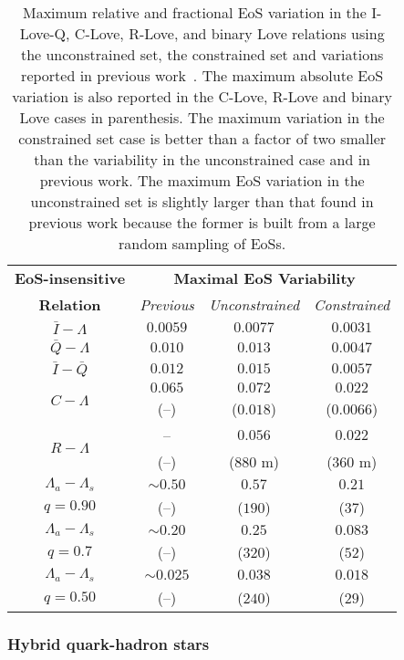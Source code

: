 \documentclass[prd,twocolumn,nofootinbib,superscriptaddress,amsmath,amssymb]{revtex4-1}
\begin{document}
\begin{table}[htb]
\centering
\begin{tabular}{ c  || c c c } 
 \hline
 \hline
 \textbf{EoS-insensitive} & \multicolumn{3}{c}{\textbf{Maximal EoS Variability}} \\
 \cline{2-4}
 \textbf{Relation} & \multicolumn{1}{c|}{\emph{Previous}} & \multicolumn{1}{c|}{\emph{Unconstrained}} & \emph{Constrained}\\
 \hline
 $\bar{I}-\Lambda$ &  $0.0059$ & $0.0077$ & $0.0031$\\
 $\bar{Q}-\Lambda$ & $0.010$ & $0.013$ & $0.0047$\\
 $\bar{I}-\bar{Q}$ & $0.012$ & $0.015$ & $0.0057$\\
 \hline
 \multirow{2}{*}{$C-\Lambda$} & $0.065$ & $0.072$ & $0.022$\\
 & (--) & ($0.018$) & ($0.0066$)\\
  \hline
 \multirow{2}{*}{$R-\Lambda$} & -- & $0.056$ & $0.022$\\
 & (--) & ($880 \text{ m}$) & ($360 \text{ m}$) \\
 \hline
 $\Lambda_a-\Lambda_s$ & $\sim0.50$ & $0.57$ & $0.21$\\
 $q=0.90$ & (--) & ($190$) & ($37$) \\
 \cline{1-1}
 $\Lambda_a-\Lambda_s$ & $\sim0.20$ & $0.25$ & $0.083$\\
  $q=0.7$ & (--) & ($320$) & ($52$) \\
  \cline{1-1}
 $\Lambda_a-\Lambda_s$ & $\sim0.025$ & $0.038$ & $0.018$\\
  $q=0.50$ & (--) & ($240$) & ($29$) \\
  \cline{1-1}
\hline
\hline
\end{tabular}
\caption{Maximum relative and fractional EoS variation in the I-Love-Q, C-Love, R-Love, and binary Love relations using the unconstrained set, the constrained set and variations reported in previous work~\cite{Yagi:ILQ,Yagi:binLove}. The maximum absolute EoS variation is also reported in the C-Love, R-Love and binary Love cases in parenthesis. The maximum variation in the constrained set case is better than a factor of two smaller than the variability in the unconstrained case and in previous work. The maximum EoS variation in the unconstrained set is slightly larger than that found in previous work because the former is built from a large random sampling of EoSs.
}\label{tab:maxVar}
\end{table}

\subsubsection{Hybrid quark-hadron stars}
\label{sec:ilq-hyb}
\end{document}
